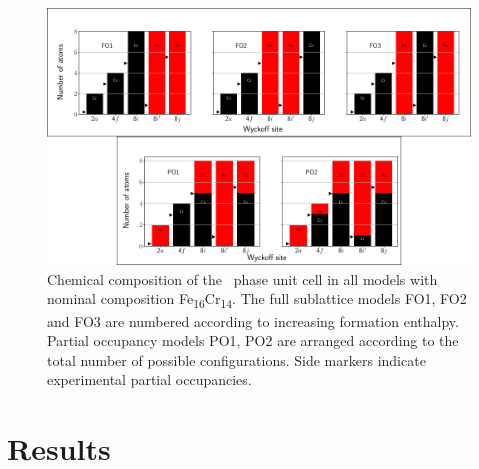 \documentclass[superscriptaddress, 12pt]{revtex4-2}%
\newcommand{\MFnew}[1]{{\color{purple} #1}}
\begin{document}
\begin{figure}[h]
  
  \includegraphics[width=\linewidth]{Figure_Occupancies.pdf}
  \caption{\protect\label{fig:PartialOccupancies}
    Chemical composition of the \textsigma ~phase unit cell in all models with nominal composition Fe\textsubscript{16}Cr\textsubscript{14}. 
    The full sublattice models FO1, FO2 and FO3 are numbered according to increasing formation enthalpy. 
    Partial occupancy models PO1, PO2 are arranged according to the total number of possible configurations.
    Side markers indicate experimental partial occupancies.
%    
  }
\end{figure}

\section{Results}
\end{document}
